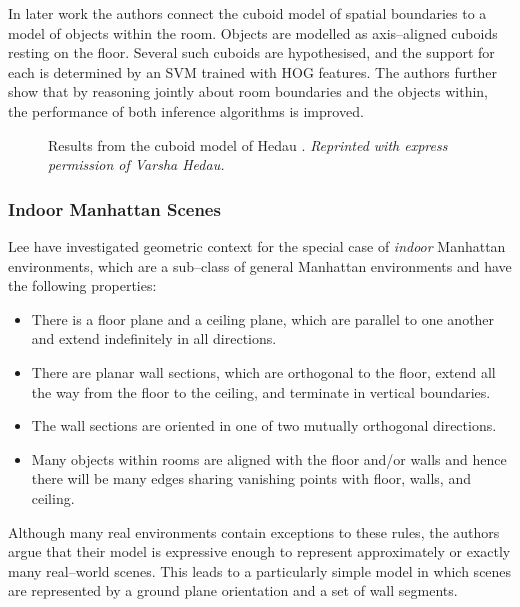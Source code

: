 In later work \cite{Hedau2010} the authors connect the cuboid model of
spatial boundaries to a model of objects within the room. Objects are
modelled as axis--aligned cuboids resting on the floor. Several such
cuboids are hypothesised, and the support for each is determined by an
SVM trained with HOG features. The authors further show that by
reasoning jointly about room boundaries and the objects within, the
performance of both inference algorithms is improved.

\begin{figure}[tb]
  \centering
  \caption{Results from the cuboid model of Hedau \etal
    \cite{Hedau09,Hedau2010}.
    \textit{Reprinted with express permission of Varsha Hedau.}
  }
  \label{fig:hedau-result}
\end{figure}

\subsubsection{Indoor Manhattan Scenes}

Lee \etal \cite{Lee09} have investigated geometric context for the
special case of \textit{indoor} Manhattan environments, which are a
sub--class of general Manhattan environments and have the following
properties:
\begin{itemize}
  \item{There is a floor plane and a ceiling plane, which are parallel
    to one another and extend indefinitely in all directions.}
  \item{There are planar wall sections, which are orthogonal to the
    floor, extend all the way from the floor to the ceiling, and
    terminate in vertical boundaries.}
  \item{The wall sections are oriented in one of two mutually
    orthogonal directions.}
  \item{Many objects within rooms are aligned with the floor and/or
    walls and hence there will be many edges sharing vanishing points
    with floor, walls, and ceiling.}
\end{itemize}

Although many real environments contain exceptions to these rules, the
authors argue that their model is expressive enough to represent
approximately or exactly many real--world scenes. This leads to a
particularly simple model in which scenes are represented by a ground
plane orientation and a set of wall segments.

